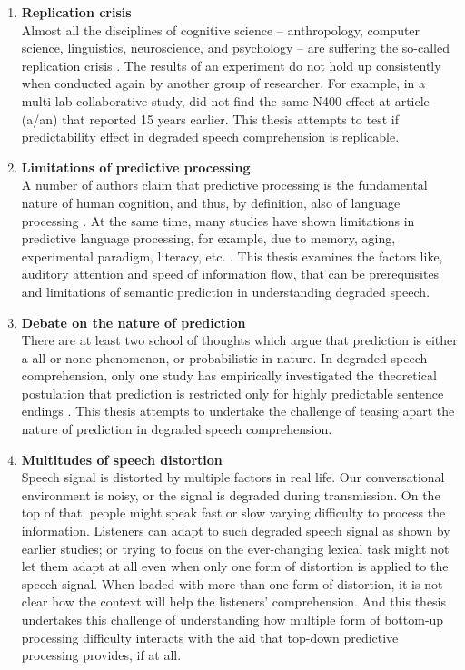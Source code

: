 \documentclass[a4paper, nobind]{templates/ociamthesis}
\begin{document}
\begin{enumerate}
\def\labelenumi{(\roman{enumi})}
\item
  \textbf{Replication crisis}\\
  Almost all the disciplines of cognitive science -- anthropology, computer science, linguistics, neuroscience, and psychology -- are suffering the so-called replication crisis \autocites[e.g.,][]{Sanderson2008,OSC2015,Ebersole2016,Cockburn2020}.
  The results of an experiment do not hold up consistently when conducted again by another group of researcher.
  For example, in a multi-lab collaborative study, \textcite{Nieuwland2020a} did not find the same N400 effect at article (a/an) that \textcite{Delong2005} reported 15 years earlier.
  This thesis attempts to test if predictability effect in degraded speech comprehension is replicable.
\item
  \textbf{Limitations of predictive processing}\\
  A number of authors claim that predictive processing is the fundamental nature of human cognition, and thus, by definition, also of language processing \autocite{Clark2013,Friston2020,Friston2020b,Lupyan2015}.
  At the same time, many studies have shown limitations in predictive language processing, for example, due to memory, aging, experimental paradigm, literacy, etc. \autocite{Huettig2016,Mishra2012,Federmeier2010,Huettig2019}.
  This thesis examines the factors like, auditory attention and speed of information flow, that can be prerequisites and limitations of semantic prediction in understanding degraded speech.
\item
  \textbf{Debate on the nature of prediction}\\
  There are at least two school of thoughts which argue that prediction is either a all-or-none phenomenon, or probabilistic in nature.
  In degraded speech comprehension, only one study has empirically investigated the theoretical postulation that prediction is restricted only for highly predictable sentence endings \autocite{Strauss2013}.
  This thesis attempts to undertake the challenge of teasing apart the nature of prediction in degraded speech comprehension.
\item
  \textbf{Multitudes of speech distortion}\\
  Speech signal is distorted by multiple factors in real life.
  Our conversational environment is noisy, or the signal is degraded during transmission.
  On the top of that, people might speak fast or slow varying difficulty to process the information.
  Listeners can adapt to such degraded speech signal as shown by earlier studies;
  or trying to focus on the ever-changing lexical task might not let them adapt at all even when only one form of distortion is applied to the speech signal.
  When loaded with more than one form of distortion, it is not clear how the context will help the listeners' comprehension.
  And this thesis undertakes this challenge of understanding how multiple form of bottom-up processing difficulty interacts with the aid that top-down predictive processing provides, if at all.
\end{enumerate}
\end{document}
